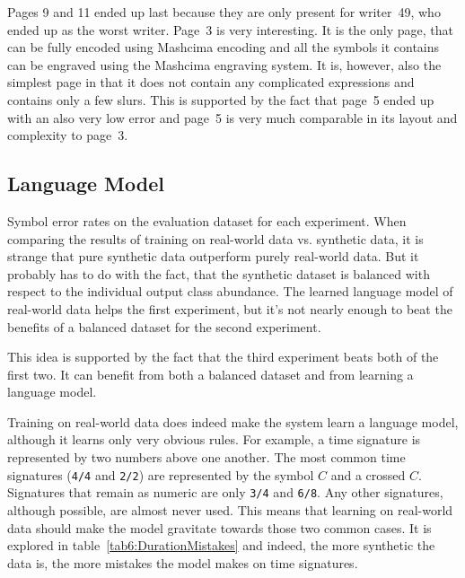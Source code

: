 Pages 9 and 11 ended up last because they are only present for writer~49, who ended up as the worst writer. Page~3 is very interesting. It is the only page, that can be fully encoded using Mashcima encoding and all the symbols it contains can be engraved using the Mashcima engraving system. It is, however, also the simplest page in that it does not contain any complicated expressions and contains only a few slurs. This is supported by the fact that page~5 ended up with an also very low error and page~5 is very much comparable in its layout and complexity to page~3.

\newpage


\subsection{Language Model}
\label{sec:LanguageModel}

Symbol error rates on the evaluation dataset for each experiment. When comparing the results of training on real-world data vs. synthetic data, it is strange that pure synthetic data outperform purely real-world data. But it probably has to do with the fact, that the synthetic dataset is balanced with respect to the individual output class abundance. The learned language model of real-world data helps the first experiment, but it's not nearly enough to beat the benefits of a balanced dataset for the second experiment.

This idea is supported by the fact that the third experiment beats both of the first two. It can benefit from both a balanced dataset and from learning a language model.

Training on real-world data does indeed make the system learn a language model, although it learns only very obvious rules. For example, a time signature is represented by two numbers above one another. The most common time signatures (\texttt{4/4} and \texttt{2/2}) are represented by the symbol $C$ and a crossed $C$. Signatures that remain as numeric are only \texttt{3/4} and \texttt{6/8}. Any other signatures, although possible, are almost never used. This means that learning on real-world data should make the model gravitate towards those two common cases. It is explored in table~\ref{tab6:DurationMistakes} and indeed, the more synthetic the data is, the more mistakes the model makes on time signatures.

